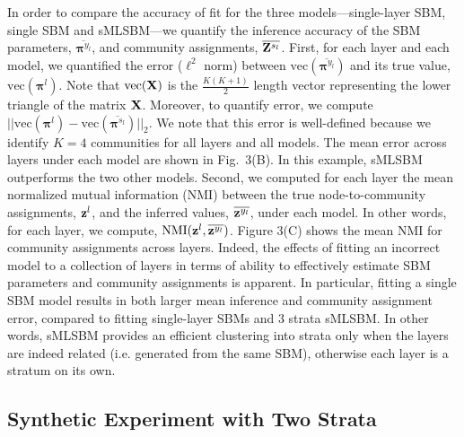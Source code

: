 {%
In order to compare the accuracy of fit for the three models---single-layer SBM, single SBM and sMLSBM---we quantify the inference accuracy of the SBM parameters, $\overline{{\boldsymbol \pi}^{y_{l}}}$, and community assignments, $\overline{{\bf Z}^{s_{l}}}$. 
%
First, for each layer and each model, we quantified the error ($\ell^{2}$ norm) between $\text{vec}(\overline{{\boldsymbol \pi}^{y_{l}}})$ and its true value, $\text{vec}({\boldsymbol \pi}^{l})$. Note that $\text{vec}({\bf X})$ is the $\frac{K(K+1)}{2}$ length vector representing the lower triangle of the matrix ${\bf X}$.  Moreover, to quantify error,
we compute $||\mbox{vec}({\boldsymbol \pi^{l}})-\text{vec}(\overline{{\boldsymbol \pi}^{s_{l}}})||_{2}$.  We note that this error is well-defined because we identify $K=4$ communities for all layers and all models. The mean error across layers under each model are shown in Fig.~3(B). In this example, sMLSBM outperforms the two other models.
%
Second, we computed for each layer the mean normalized mutual information (NMI) \cite{commdeccompare} between the true node-to-community assignments, ${\bf z}^{l}$, and the inferred values, $\overline{{\bf z}^{y_{l}}}$, under each model. In other words, for each layer, we compute, $\text{NMI}({\bf z}^{l},\overline{{\bf z}^{y_{l}}})$. Figure 3(C) shows the mean NMI for community assignments across layers. Indeed, the effects of fitting an incorrect model to a collection of layers in terms of ability to effectively estimate SBM parameters and community assignments is apparent. In particular, fitting a single SBM model results in both larger mean inference and community assignment error, compared to fitting single-layer SBMs and 3 strata sMLSBM. In other words, sMLSBM provides an efficient clustering into strata only when the layers are indeed related (i.e. generated from the same SBM), otherwise each layer is a stratum on its own.

\subsection{Synthetic Experiment with Two Strata}\label{sec:2strata}

}
